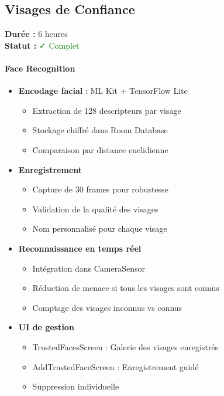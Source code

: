 \documentclass[11pt,a4paper]{article}
\begin{document}
\subsection{Visages de Confiance}

\textbf{Durée :} 6 heures \\
\textbf{Statut :} \textcolor{green}{✓ Complet}

\paragraph{Face Recognition}
\begin{itemize}
    \item \textbf{Encodage facial} : ML Kit + TensorFlow Lite
    \begin{itemize}
        \item Extraction de 128 descripteurs par visage
        \item Stockage chiffré dans Room Database
        \item Comparaison par distance euclidienne
    \end{itemize}
    \item \textbf{Enregistrement}
    \begin{itemize}
        \item Capture de 30 frames pour robustesse
        \item Validation de la qualité des visages
        \item Nom personnalisé pour chaque visage
    \end{itemize}
    \item \textbf{Reconnaissance en temps réel}
    \begin{itemize}
        \item Intégration dans CameraSensor
        \item Réduction de menace si tous les visages sont connus
        \item Comptage des visages inconnus vs connus
    \end{itemize}
    \item \textbf{UI de gestion}
    \begin{itemize}
        \item TrustedFacesScreen : Galerie des visages enregistrés
        \item AddTrustedFaceScreen : Enregistrement guidé
        \item Suppression individuelle
    \end{itemize}
\end{itemize}
\end{document}
